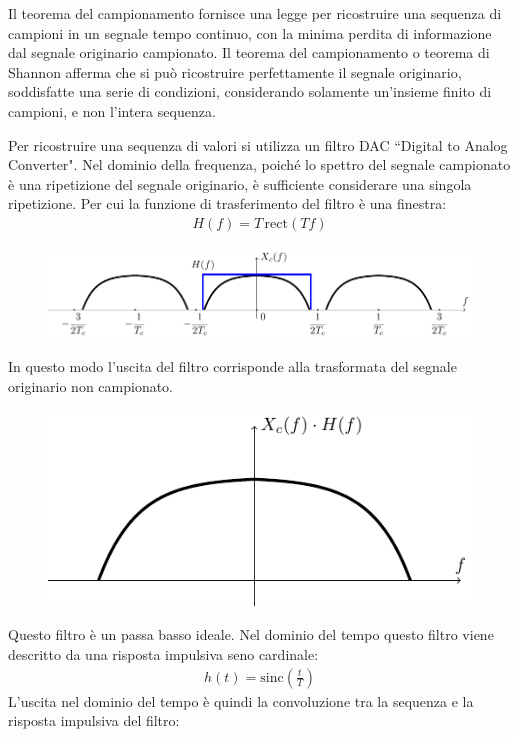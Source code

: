 \documentclass{article}
\newcommand{\rect}{\mathrm{rect}}
\newcommand{\sinc}{\mathrm{sinc}}
\numberwithin{equation}{subsection}
\begin{document}
Il teorema del campionamento fornisce una legge per ricostruire una sequenza di campioni in un segnale tempo continuo, con la minima perdita di informazione dal segnale 
originario campionato. Il teorema del campionamento o teorema di Shannon afferma che si può ricostruire perfettamente il segnale originario, soddisfatte una serie di condizioni, 
considerando solamente un'insieme finito di campioni, e non l'intera sequenza. 

Per ricostruire una sequenza di valori si utilizza un filtro DAC ``Digital to Analog Converter". Nel dominio della frequenza, poiché lo spettro del segnale campionato è una 
ripetizione del segnale originario, è sufficiente considerare una singola ripetizione. Per cui la funzione di trasferimento del filtro è una finestra:
\begin{gather*}
    H(f)=T\,\rect(Tf)
\end{gather*}
\begin{figure}[H]%
    \centering
    \includegraphics{segnale-replicato-filtro.pdf}%
\end{figure}
In questo modo l'uscita del filtro corrisponde alla trasformata del segnale originario non campionato. 
\begin{figure}[H]%
    \centering
    \includegraphics{segnale-replicato-filtrato.pdf}
\end{figure}
Questo filtro è un passa basso ideale. Nel dominio del tempo questo filtro viene descritto da una risposta impulsiva seno cardinale:
\begin{gather*}
    h(t)=\sinc\left(\displaystyle\frac{t}{T}\right)
\end{gather*}
L'uscita nel dominio del tempo è quindi la convoluzione tra la sequenza e la risposta impulsiva del filtro:
\end{document}
